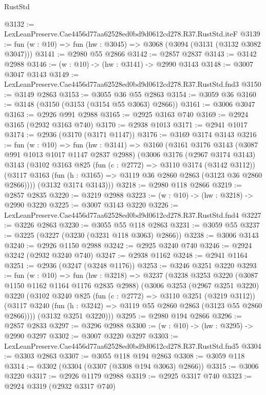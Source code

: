 \begin{lexlean}{RustStd}
\begin{coremodule}
@3132 := LexLeanPreserve.Cae4456d77aa62528ed0bd9d0612cd278.R37.RustStd.iteF
@3139 := fun (w : @10) => fun (hw : @3045) => @3068 (@3094 (@3131 (@3132 @3082 @3047)))
@3141 := @2980 @55 @2866
@3142 := @2857 @2837
@3143 := @3142 @2988
@3146 := (w : @10) -> (hw : @3141) -> @2990 @3143
@3148 := @3007 @3047 @3143
@3149 := LexLeanPreserve.Cae4456d77aa62528ed0bd9d0612cd278.R37.RustStd.fnd3
@3150 := @3149 @2863
@3153 := @3055 @36 @55 @2863
@3154 := @3059 @36
@3160 := @3148 (@3150 (@3153 (@3154 @55 @3063) @2866))
@3161 := @3006 @3047
@3163 := @2926 @991 @2988
@3165 := @2925 @3163 @740
@3169 := @2924 @3165 (@2932 @3163 @740)
@3170 := @2938 @1013
@3171 := @2941 @1017
@3174 := @2936 (@3170 (@3171 @1147))
@3176 := @3169 @3174 @3143
@3216 := fun (w : @10) =>
  fun (hw : @3141) =>
  @3160
    (@3161
      @3176
      @3143
      (@3087 @991 @1013 @1017 @1147 @2837 @2988)
      (@3006
        @3176
        (@2967 @3174 @3143)
        @3143
        (@3102
          @3163
          @825
          (fun (c : @2772) => @3110 @3174 (@3142 @3112))
          (@3117 @3163 (fun (h : @3165) => @3119 @36 @2860 @2863 (@3123 @36 @2860 @2866))))
        (@3132 @3174 @3143)))
@3218 := @2980 @118 @2866
@3219 := @2857 @2835
@3220 := @3219 @2988
@3223 := (w : @10) -> (hw : @3218) -> @2990 @3220
@3225 := @3007 @3143 @3220
@3226 := LexLeanPreserve.Cae4456d77aa62528ed0bd9d0612cd278.R37.RustStd.fnd4
@3227 := @3226 @2863
@3230 := @3055 @55 @118 @2863
@3231 := @3059 @55
@3237 := @3225 (@3227 (@3230 (@3231 @118 @3063) @2866))
@3238 := @3006 @3143
@3240 := @2926 @1150 @2988
@3242 := @2925 @3240 @740
@3246 := @2924 @3242 (@2932 @3240 @740)
@3247 := @2938 @1162
@3248 := @2941 @1164
@3251 := @2936 (@3247 (@3248 @1176))
@3253 := @3246 @3251 @3220
@3293 := fun (w : @10) =>
  fun (hw : @3218) =>
  @3237
    (@3238
      @3253
      @3220
      (@3087 @1150 @1162 @1164 @1176 @2835 @2988)
      (@3006
        @3253
        (@2967 @3251 @3220)
        @3220
        (@3102
          @3240
          @825
          (fun (c : @2772) => @3110 @3251 (@3219 @3112))
          (@3117 @3240 (fun (h : @3242) => @3119 @55 @2860 @2863 (@3123 @55 @2860 @2866))))
        (@3132 @3251 @3220)))
@3295 := @2980 @194 @2866
@3296 := @2857 @2833
@3297 := @3296 @2988
@3300 := (w : @10) -> (hw : @3295) -> @2990 @3297
@3302 := @3007 @3220 @3297
@3303 := LexLeanPreserve.Cae4456d77aa62528ed0bd9d0612cd278.R37.RustStd.fnd5
@3304 := @3303 @2863
@3307 := @3055 @118 @194 @2863
@3308 := @3059 @118
@3314 := @3302 (@3304 (@3307 (@3308 @194 @3063) @2866))
@3315 := @3006 @3220
@3317 := @2926 @1179 @2988
@3319 := @2925 @3317 @740
@3323 := @2924 @3319 (@2932 @3317 @740)

\end{coremodule}
\end{lexlean}
